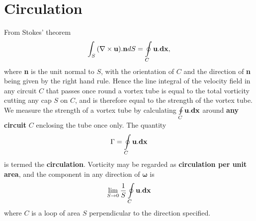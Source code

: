 \documentclass[twoside,a4paper,11pt]{report}
\begin{document}



\section{Circulation}
\label{subsec:circulation}

From Stokes' theorem
\[
\int_S {\left( {\nabla \times {{\bf u}}} \right)} . {{\bf 
n}}dS=\oint\limits_C {{{\bf u}}. {{\bf dx}}} ,
\]
where \textbf{n} is the unit normal to $S$, with the orientation of $C$ and the 
direction of \textbf{n} being given by the right hand rule. Hence the line 
integral of the velocity field in any circuit $C$ that passes once round a 
vortex tube is equal to the total vorticity cutting any cap $S$ on $C$, and is 
therefore equal to the strength of the vortex tube. We measure the strength 
of a vortex tube by calculating $\oint\limits_C {{{\bf u}}. {\rm 
{\bf dx}}} $ around \textbf{any circuit } $C$ enclosing the tube once only. The 
quantity 
\[ \Gamma =\oint\limits_C {{{\bf u}}. {{\bf dx}}} \]
 is termed the \textbf{circulation}. Vorticity may be regarded as 
\textbf{circulation per unit area}, and the component in any direction of 
${\bm \omega}$ is
\[
\mathop {\lim }\limits_{S\to 0} \frac{1}{S}\oint\limits_C {{{\bf 
u}}. {{\bf dx}}} 
\]
where $C$ is a loop of area $S$ perpendicular to the direction specified.
\end{document}

